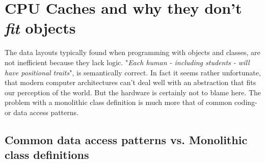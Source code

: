 \section{CPU Caches and why they don't \textit{fit} objects}\label{cpu_caches}
The data layouts typically found when programming with objects and classes, are not inefficient because they lack logic. "\textit{Each human - including students - will have positional traits}", is semantically correct. In fact it seems rather unfortunate, that modern computer architectures can't deal well with an abstraction that fits our perception of the world. But the hardware is certainly not to blame here. The problem with a monolithic class definition is much more that of common coding- or data access patterns.\\
\subsection{Common data access patterns vs. Monolithic class definitions}\label{cdap}


